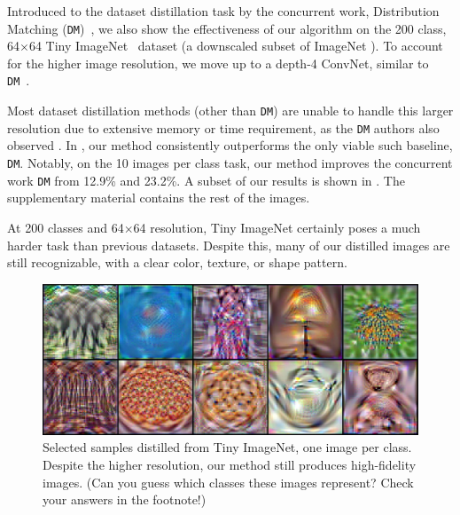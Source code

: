 \documentclass[main.tex]{subfiles}
\begin{document}
Introduced to the dataset distillation task by the concurrent work, Distribution Matching (\texttt{DM})~\cite{dm}, we also show the effectiveness of our algorithm on the 200 class, 64$\times$64 Tiny ImageNet~\cite{tiny} dataset (a downscaled subset of ImageNet \cite{deng2009imagenet}). %
To account for the higher image resolution, we move up to a depth-4 ConvNet, similar to \texttt{DM}~\cite{dm}.

Most dataset distillation methods (other than \texttt{DM}) are unable to handle this larger resolution due to extensive memory or time requirement, as the \texttt{DM} authors also observed \citep{dm}. In , our method consistently outperforms the only viable such baseline, \texttt{DM}. Notably, on the 10 images per class task, our method improves the concurrent work \texttt{DM} from  12.9\% and 23.2\%. A subset of our results is shown in . The supplementary material contains the rest of the images. %


At 200 classes and 64$\times$64 resolution, Tiny ImageNet certainly poses a much harder task than previous datasets. Despite this, many of our distilled images are still recognizable, with a clear color, texture, or shape pattern.
\begin{figure}[t]
    \centering
    \includegraphics[width=\linewidth]{figures/Tiny.pdf}
         \vspace{-7pt}
    \caption{Selected samples distilled from Tiny ImageNet, one image per class. Despite the higher resolution, our method still produces high-fidelity images. (Can you guess which classes these images represent? Check your answers in the footnote!\protect\footnotemark)}
    \vspace{-7pt}
\end{figure}

\end{document}
